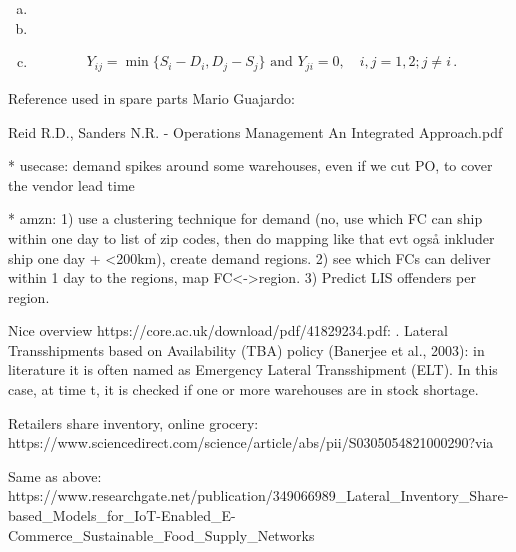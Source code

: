 \documentclass[../../main.tex]{subfiles}
\begin{document}
% 
\begin{enumerate}[a)]
    \item
    \item
    \item
    \begin{align*}
        \text{$Y_{ij} = \min\{S_i - D_i,D_j-S_j\}$ and $Y_{ji} = 0,\quad i,j = 1,2; j \neq i\,$.}
    \end{align*}
\end{enumerate}





Reference used in spare parts Mario Guajardo: %


Reid R.D., Sanders N.R. - Operations Management An Integrated Approach.pdf


* usecase: demand spikes around some warehouses, even if we cut PO, to cover the vendor lead time

* amzn: 1) use a clustering technique for demand (no, use which FC can ship within one day to list of zip codes, then do mapping like that evt også inkluder ship one day + <200km), create demand regions. 2) see which FCs can deliver within 1 day to the regions, map FC<->region. 3) Predict LIS offenders per region. 

Nice overview https://core.ac.uk/download/pdf/41829234.pdf:
. Lateral Transshipments based on Availability (TBA) policy (Banerjee et al., 2003): in literature it is often named as Emergency Lateral Transshipment (ELT). In this case, at time t, it is checked if one or more warehouses are in stock shortage. 

Retailers share inventory, online grocery: https://www.sciencedirect.com/science/article/abs/pii/S0305054821000290?via%

Same as above:
https://www.researchgate.net/publication/349066989_Lateral_Inventory_Share-based_Models_for_IoT-Enabled_E-Commerce_Sustainable_Food_Supply_Networks


\end{document}
